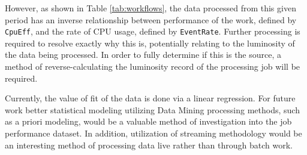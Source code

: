 \documentclass[print,ms]{nuthesis}
\begin{document}
However, as shown in Table \ref{tab:workflows}, the data processed from this given period has an inverse relationship between performance of the work, defined by \texttt{CpuEff}, and the rate of CPU usage, defined by \texttt{EventRate}. Further processing is required to resolve exactly why this is, potentially relating to the luminosity\cite{lumi} of the data being processed. In order to fully determine if this is the source, a method of reverse-calculating the luminosity record of the processing job will be required.

Currently, the value of fit of the data is done via a linear regression. For future work better statistical modeling utilizing Data Mining processing methods, such as a priori modeling, would be a valuable method of investigation into the job performance dataset. In addition, utilization of streaming methodology would be an interesting method of processing data live rather than through batch work.




\backmatter



\end{document}
